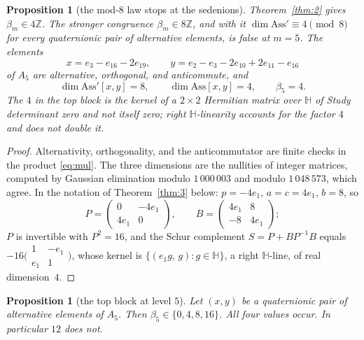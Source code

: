 \documentclass{baustms}
\theoremstyle{cupthm}
\newtheorem{prop}[thm]{Proposition}
\numberwithin{equation}{section}
\newcommand{\Ass}{\mathrm{Ass}}
\newcommand{\HH}{\mathbb{H}}
\begin{document}
\begin{prop}[the mod-8 law stops at the sedenions]\label{prop:6}
Theorem~\ref{thm:2} gives $\beta_m\in 4\mathbb{Z}$. The stronger congruence $\beta_m\in 8\mathbb{Z}$, and with it $\dim\Ass'\equiv 4\pmod{8}$ for every quaternionic pair of alternative elements, is false at $m=5$. The elements
\[
x=e_3-e_{16}-2e_{19},\qquad y=e_2-e_3-2e_{10}+2e_{11}-e_{16}
\]
of $A_5$ are alternative, orthogonal, and anticommute, and
\[
\dim\Ass'[x,y]=8,\qquad \dim\Ass[x,y]=4,\qquad \beta_5=4.
\]
The $4$ in the top block is the kernel of a $2\times 2$ Hermitian matrix over $\HH$ of Study determinant zero and not itself zero; right $\HH$-linearity accounts for the factor $4$ and does not double it.
\end{prop}

\begin{proof}
Alternativity, orthogonality, and the anticommutator are finite checks in the product \eqref{eq:mul}. The three dimensions are the nullities of integer matrices, computed by Gaussian elimination modulo $1\,000\,003$ and modulo $1\,048\,573$, which agree. In the notation of Theorem~\ref{thm:3} below: $p=-4e_1$, $a=c=4e_1$, $b=8$, so
\[
P=\begin{pmatrix}0&-4e_1\\ 4e_1&0\end{pmatrix},\qquad
B=\begin{pmatrix}4e_1&8\\ -8&4e_1\end{pmatrix};
\]
$P$ is invertible with $P^2=16$, and the Schur complement $S=P+BP^{-1}B$ equals $-16\bigl(\begin{smallmatrix}1&-e_1\\ e_1&1\end{smallmatrix}\bigr)$, whose kernel is $\{(e_1 g,\, g):g\in\HH\}$, a right $\HH$-line, of real dimension~$4$.
\end{proof}

\begin{prop}[the top block at level $5$]\label{prop:7}
Let $(x,y)$ be a quaternionic pair of alternative elements of $A_5$. Then $\beta_5\in\{0,4,8,16\}$. All four values occur. In particular $12$ does not.
\end{prop}
\end{document}
